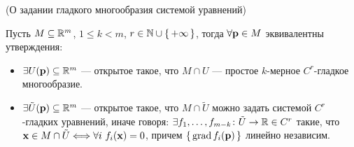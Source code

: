 \begin{theorem}(О задании гладкого многообразия системой уравнений)

    Пусть $M \subseteq \mathbb{R}^m$, $1 \leqslant k < m$, $r \in \mathbb{N} \cup
    \{\,+\infty\,\}$, тогда $\forall \mathbf{p} \in M$ эквивалентны утверждения:
    \begin{itemize}
        \item $\exists U(\mathbf{p}) \subseteq \mathbb{R}^m$ --- открытое такое, что
        $M \cap U$ --- простое $k$-мерное $C^r$-гладкое многообразие.
        \item $\exists \tilde{U}(\mathbf{p}) \subseteq \mathbb{R}^m$ --- открытое такое,
        что $M \cap \tilde{U}$ можно задать системой $C^r$-гладких уравнений,
        иначе говоря: $\exists f_1, \ldots, f_{m - k} \colon \tilde{U} \to \mathbb{R}
        \in C^r$ такие, что \\ $\mathbf{x} \in M \cap \tilde{U} \Longleftrightarrow \forall i~
        f_i(\mathbf{x}) = 0$, причем $\{\,\operatorname{grad}f_i(\mathbf{p})\,\}$ линейно независим.
    \end{itemize}
\end{theorem}
